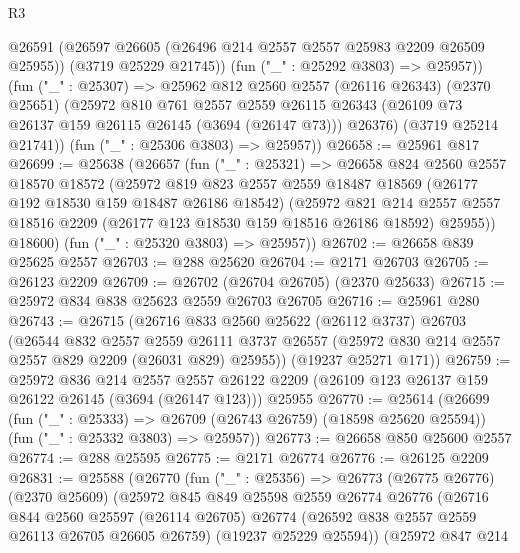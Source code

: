 \begin{lexlean}{R3}
\begin{coremodule}
        @26591
          (@26597 @26605 (@26496 @214 @2557 @2557 @25983 @2209 @26509 @25955))
          (@3719 @25229 @21745))
        (fun ("_" : @25292 @3803) => @25957))
      (fun ("_" : @25307) =>
      @25962
        @812
        @2560
        @2557
        (@26116 @26343)
        (@2370 @25651)
        (@25972
          @810
          @761
          @2557
          @2559
          @26115
          @26343
          (@26109 @73 @26137 @159 @26115 @26145 (@3694 (@26147 @73)))
          @26376)
        (@3719 @25214 @21741))
      (fun ("_" : @25306 @3803) => @25957))
@26658 := @25961 @817
@26699 := @25638
    (@26657
      (fun ("_" : @25321) =>
      @26658
        @824
        @2560
        @2557
        @18570
        @18572
        (@25972
          @819
          @823
          @2557
          @2559
          @18487
          @18569
          (@26177 @192 @18530 @159 @18487 @26186 @18542)
          (@25972
            @821
            @214
            @2557
            @2557
            @18516
            @2209
            (@26177 @123 @18530 @159 @18516 @26186 @18592)
            @25955))
        @18600)
      (fun ("_" : @25320 @3803) => @25957))
@26702 := @26658 @839 @25625 @2557
@26703 := @288 @25620
@26704 := @2171 @26703
@26705 := @26123 @2209
@26709 := @26702 (@26704 @26705) (@2370 @25633)
@26715 := @25972 @834 @838 @25623 @2559 @26703 @26705
@26716 := @25961 @280
@26743 := @26715
    (@26716
      @833
      @2560
      @25622
      (@26112 @3737)
      @26703
      (@26544
        @832
        @2557
        @2559
        @26111
        @3737
        @26557
        (@25972 @830 @214 @2557 @2557 @829 @2209 (@26031 @829) @25955))
      (@19237 @25271 @171))
@26759 := @25972
    @836
    @214
    @2557
    @2557
    @26122
    @2209
    (@26109 @123 @26137 @159 @26122 @26145 (@3694 (@26147 @123)))
    @25955
@26770 := @25614
    (@26699
      (fun ("_" : @25333) => @26709 (@26743 @26759) (@18598 @25620 @25594))
      (fun ("_" : @25332 @3803) => @25957))
@26773 := @26658 @850 @25600 @2557
@26774 := @288 @25595
@26775 := @2171 @26774
@26776 := @26125 @2209
@26831 := @25588
    (@26770
      (fun ("_" : @25356) =>
      @26773
        (@26775 @26776)
        (@2370 @25609)
        (@25972
          @845
          @849
          @25598
          @2559
          @26774
          @26776
          (@26716
            @844
            @2560
            @25597
            (@26114 @26705)
            @26774
            (@26592 @838 @2557 @2559 @26113 @26705 @26605 @26759)
            (@19237 @25229 @25594))
          (@25972
            @847
            @214

\end{coremodule}
\end{lexlean}
